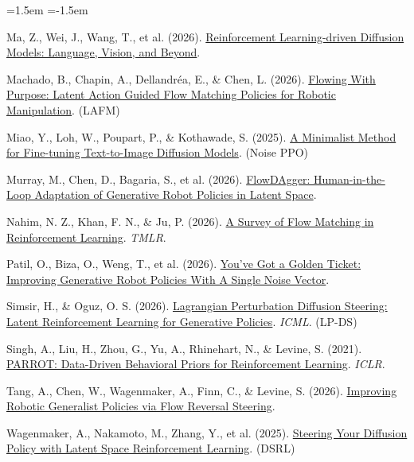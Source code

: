 \begin{list}{}{\leftmargin=1.5em \itemindent=-1.5em \itemsep=2pt \parsep=0pt}
\item {}Ma, Z., Wei, J., Wang, T., et al. (2026). \href{https://arxiv.org/abs/2610.21539}{Reinforcement Learning-driven Diffusion Models: Language, Vision, and Beyond}.
\item {}Machado, B., Chapin, A., Dellandréa, E., \& Chen, L. (2026). \href{https://arxiv.org/abs/2606.23420}{Flowing With Purpose: Latent Action Guided Flow Matching Policies for Robotic Manipulation}. (LAFM)
\item {}Miao, Y., Loh, W., Poupart, P., \& Kothawade, S. (2025). \href{https://arxiv.org/abs/2506.12036}{A Minimalist Method for Fine-tuning Text-to-Image Diffusion Models}. (Noise PPO)
\item {}Murray, M., Chen, D., Bagaria, S., et al. (2026). \href{https://arxiv.org/abs/2607.08877}{FlowDAgger: Human-in-the-Loop Adaptation of Generative Robot Policies in Latent Space}.
\item {}Nahim, N. Z., Khan, F. N., \& Ju, P. (2026). \href{https://arxiv.org/abs/2610.16275}{A Survey of Flow Matching in Reinforcement Learning}. \emph{TMLR}.
\item {}Patil, O., Biza, O., Weng, T., et al. (2026). \href{https://arxiv.org/abs/2603.15757}{You've Got a Golden Ticket: Improving Generative Robot Policies With A Single Noise Vector}.
\item {}Simsir, H., \& Oguz, O. S. (2026). \href{https://arxiv.org/abs/2606.01151}{Lagrangian Perturbation Diffusion Steering: Latent Reinforcement Learning for Generative Policies}. \emph{ICML}. (LP-DS)
\item {}Singh, A., Liu, H., Zhou, G., Yu, A., Rhinehart, N., \& Levine, S. (2021). \href{https://arxiv.org/abs/2011.10024}{PARROT: Data-Driven Behavioral Priors for Reinforcement Learning}. \emph{ICLR}.
\item {}Tang, A., Chen, W., Wagenmaker, A., Finn, C., \& Levine, S. (2026). \href{https://arxiv.org/abs/2606.13675}{Improving Robotic Generalist Policies via Flow Reversal Steering}.
\item {}Wagenmaker, A., Nakamoto, M., Zhang, Y., et al. (2025). \href{https://arxiv.org/abs/2506.15799}{Steering Your Diffusion Policy with Latent Space Reinforcement Learning}. (DSRL)

\end{list}
